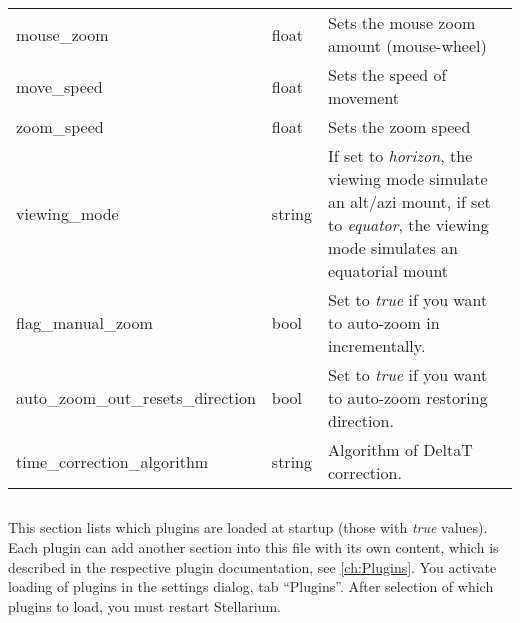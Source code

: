 \begin{longtable}{l|l|p{77mm}}
mouse\_zoom                     & float  & Sets the mouse zoom amount (mouse-wheel)\\%
move\_speed                     & float  & Sets the speed of movement\\%
zoom\_speed                     & float  & Sets the zoom speed\\%
viewing\_mode                   & string & If set to \emph{horizon}, the viewing mode simulate an alt/azi mount, 
                                           if set to \emph{equator}, the viewing mode simulates an equatorial mount\\%
flag\_manual\_zoom              & bool   & Set to \emph{true} if you want to auto-zoom in incrementally.\\%
auto\_zoom\_out\_resets\_direction & bool & Set to \emph{true} if you want to auto-zoom restoring direction.\\%
time\_correction\_algorithm     & string & Algorithm of DeltaT correction.\\\bottomrule %
\end{longtable}

\subsection{}

This section lists which plugins are loaded at startup (those with
\emph{true} values). Each plugin can add another section into this
file with its own content, which is described in the respective plugin
documentation, see \ref{ch:Plugins}. You activate loading of plugins
in the  settings dialog, tab ``Plugins''. After selection of
which plugins to load, you must restart Stellarium.

